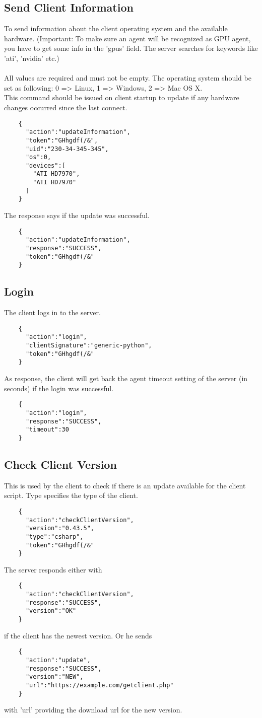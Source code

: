 \documentclass{article}
\begin{document}
	\subsection*{Send Client Information}
	To send information about the client operating system and the available hardware. (Important: To make sure an agent will be recognized as GPU agent, you have to get some info in the 'gpus' field. The server searches for keywords like 'ati', 'nvidia' etc.)\\ \\
	All values are required and must not be empty. The operating system should be set as following: 0 => Linux, 1 => Windows, 2 => Mac OS X.\\
	This command should be issued on client startup to update if any hardware changes occurred since the last connect.
	\begin{verbatim}
	{
	  "action":"updateInformation",
	  "token":"GHhgdf(/&",
	  "uid":"230-34-345-345",
	  "os":0,
	  "devices":[
	    "ATI HD7970",
	    "ATI HD7970"
	  ]
	}
	\end{verbatim}
	
	\noindent The response says if the update was successful.
	\begin{verbatim}
	{
	  "action":"updateInformation",
	  "response":"SUCCESS",
	  "token":"GHhgdf(/&"
	} 
	\end{verbatim}
	
	\subsection*{Login}
	The client logs in to the server.
	\begin{verbatim}
	{
	  "action":"login",
	  "clientSignature":"generic-python",
	  "token":"GHhgdf(/&"
	}
	\end{verbatim}
	As response, the client will get back the agent timeout setting of the server (in seconds) if the login
	was successful.
	\begin{verbatim}
	{
	  "action":"login",
	  "response":"SUCCESS",
	  "timeout":30
	}
	\end{verbatim}
	
	\subsection*{Check Client Version}
	This is used by the client to check if there is an update available for the client script. Type specifies the type of the client.
	\begin{verbatim}
	{
	  "action":"checkClientVersion",
	  "version":"0.43.5",
	  "type":"csharp",
	  "token":"GHhgdf(/&"
	}
	\end{verbatim}
	The server responds either with
	\begin{verbatim}
	{
	  "action":"checkClientVersion",
	  "response":"SUCCESS",
	  "version":"OK"
	}
	\end{verbatim}
	if the client has the newest version. Or he sends
	\begin{verbatim}
	{
	  "action":"update",
	  "response":"SUCCESS",
	  "version":"NEW",
	  "url":"https://example.com/getclient.php"
	}
	\end{verbatim}
	with 'url' providing the download url for the new version.
	
\end{document}
